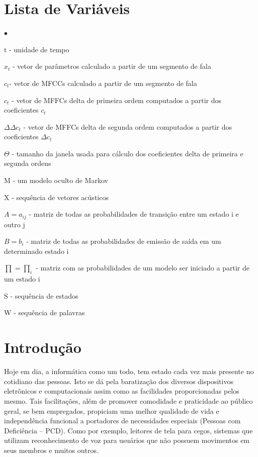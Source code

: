\documentclass[12pt,a4paper,oneside]{report}
\begin{document}
\chapter*{Lista de Variáveis}
\begin{list}{$\bullet$}{}
\item[] t - unidade de tempo
\item[] $x_{t}$ - vetor de parâmetros calculado a partir de um segmento de fala
\item[] $c_{t}$- vetor de MFCCs calculado a partir de um segmento de fala
\item[] $c_{t}$ - vetor de MFFCs delta de primeira ordem computados a partir dos coeficientes $c_{t}$
\item[] $\Delta\Delta c_{t}$ - vetor de MFFCs delta de segunda ordem computados a partir dos coeficientes $\Delta c_{t}$
\item[] $\Theta$ - tamanho da janela usada para cálculo dos coeficientes delta de primeira e segunda ordens
\item[] M - um modelo oculto de Markov
\item[] X - sequência de vetores acústicos
\item[] $A = a_{ij}$ - matriz de todas as probabilidades de transição entre um estado i e outro j
\item[] $B = b_{i}$ - matriz de todas as probabilidades de emissão de saída em um determinado estado i
\item[] $\prod = \prod_{i}$ - matriz com as probabilidades de um modelo ser iniciado a partir de um estado i
\item[] S - sequência de estados
\item[] W - sequência de palavras
\end{list}

\tableofcontents

\listoffigures

\listoftables


\chapter{Introdução}

Hoje em dia, a informática como um todo, tem estado cada vez mais presente no cotidiano das pessoas. Isto se dá pela baratização dos diversos dispositivos eletrônicos e computacionais assim como as facilidades proporcionadas pelos mesmo. Tais facilitações, além de promover comodidade e praticidade ao público geral, se bem empregados, propiciam uma melhor qualidade de vida e independência funcional a portadores de necessidades especiais (Pessoas com Deficiência – PCD). Como por exemplo, leitores de tela para cegos, sistemas que utilizam reconhecimento de voz para usuários que não possuem movimentos em seus membros e muitos outros.
\end{document}
